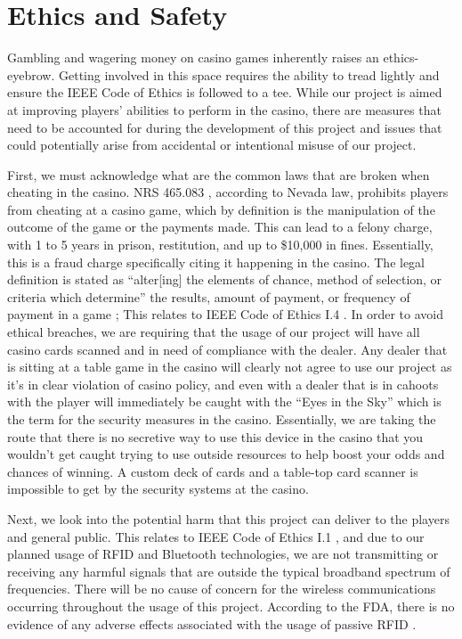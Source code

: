 \documentclass[12pt]{article}
\begin{document}
\section{Ethics and Safety}

Gambling and wagering money on casino games inherently raises an ethics-eyebrow. Getting involved in this space requires the ability to tread lightly and ensure the IEEE Code of Ethics \cite{IEEE_ethics} is followed to a tee. While our project is aimed at improving players' abilities to perform in the casino, there are measures that need to be accounted for during the development of this project and issues that could potentially arise from accidental or intentional misuse of our project. 

First, we must acknowledge what are the common laws that are broken when cheating in the casino. NRS 465.083 \cite{NRS}, according to Nevada law, prohibits players from cheating at a casino game, which by definition is the manipulation of the outcome of the game or the payments made. This can lead to a felony charge, with 1 to 5 years in prison, restitution, and up to \$10,000 in fines. Essentially, this is a fraud charge specifically citing it happening in the casino. The legal definition is stated as ``alter[ing] the elements of chance, method of selection, or criteria which determine'' the results, amount of payment, or frequency of payment in a game \cite{NRS}; This relates to IEEE Code of Ethics I.4 \cite{IEEE_ethics}. In order to avoid ethical breaches, we are requiring that the usage of our project will have all casino cards scanned and in need of compliance with the dealer. Any dealer that is sitting at a table game in the casino will clearly not agree to use our project as it's in clear violation of casino policy, and even with a dealer that is in cahoots with the player will immediately be caught with the ``Eyes in the Sky'' which is the term for the security measures in the casino. Essentially, we are taking the route that there is no secretive way to use this device in the casino that you wouldn't get caught trying to use outside resources to help boost your odds and chances of winning. A custom deck of cards and a table-top card scanner is impossible to get by the security systems at the casino. 

Next, we look into the potential harm that this project can deliver to the players and general public. This relates to IEEE Code of Ethics I.1 \cite{IEEE_ethics}, and due to our planned usage of RFID and Bluetooth technologies, we are not transmitting or receiving any harmful signals that are outside the typical broadband spectrum of frequencies. There will be no cause of concern for the wireless communications occurring throughout the usage of this project. According to the FDA, there is no evidence of any adverse effects associated with the usage of passive RFID \cite{FDA_RFID}.
\end{document}
